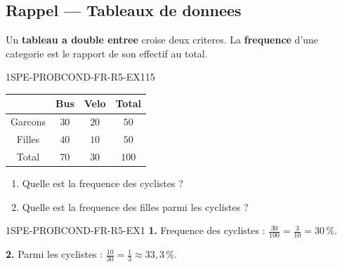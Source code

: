 

\subsection*{Rappel --- Tableaux de donnees}

Un \textbf{tableau a double entree} croise deux criteres. La \textbf{frequence} d'une categorie est le rapport de son effectif au total.

\begin{exercice}{1SPE-PROBCOND-FR-R5-EX1}{1}{5}
\begin{center}
\begin{tabular}{|c|c|c|c|}
\hline
 & Bus & Velo & Total \\
\hline
Garcons & $30$ & $20$ & $50$ \\
\hline
Filles & $40$ & $10$ & $50$ \\
\hline
Total & $70$ & $30$ & $100$ \\
\hline
\end{tabular}
\end{center}

\begin{enumerate}
  \item Quelle est la frequence des cyclistes ?
  \item Quelle est la frequence des filles parmi les cyclistes ?
\end{enumerate}
\end{exercice}


\begin{corrige}{1SPE-PROBCOND-FR-R5-EX1}
\textbf{1.} Frequence des cyclistes : $\frac{30}{100} = \frac{3}{10} = 30\,\%$.

\textbf{2.} Parmi les cyclistes : $\frac{10}{30} = \frac{1}{3} \approx 33{,}3\,\%$.
\end{corrige}
